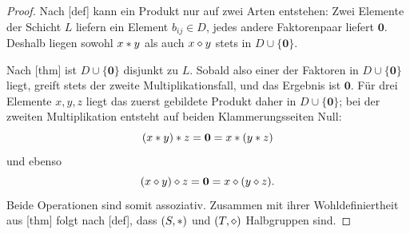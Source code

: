 \documentclass[main.tex]{subfiles}
\begin{document}
\begin{proof}
Nach [def] kann ein Produkt nur auf
zwei Arten entstehen: Zwei Elemente der Schicht \(L\) liefern ein Element
\(b_{ij}\in D\), jedes andere Faktorenpaar liefert \(\mathbf0\). Deshalb
liegen sowohl \(x\mathbin{\ast} y\) als auch \(x\mathbin{\diamond} y\) stets in
\(D\cup\{\mathbf0\}\).

Nach [thm] ist
\(D\cup\{\mathbf0\}\) disjunkt zu \(L\). Sobald also einer der Faktoren
in \(D\cup\{\mathbf0\}\) liegt, greift stets der zweite
Multiplikationsfall, und das Ergebnis ist \(\mathbf0\). Für drei Elemente
\(x,y,z\) liegt das zuerst gebildete Produkt daher in
\(D\cup\{\mathbf0\}\); bei der zweiten Multiplikation entsteht auf beiden
Klammerungsseiten Null:
\[
  (x\mathbin{\ast} y)\mathbin{\ast} z=\mathbf0
    =x\mathbin{\ast}(y\mathbin{\ast} z)
\]
und ebenso
\[
  (x\mathbin{\diamond} y)\mathbin{\diamond} z=\mathbf0
    =x\mathbin{\diamond}(y\mathbin{\diamond} z).
\]
Beide Operationen sind somit assoziativ. Zusammen mit ihrer
Wohldefiniertheit aus
[thm] folgt nach
[def], dass \((S,\mathbin{\ast})\) und
\((T,\mathbin{\diamond})\) Halbgruppen sind.
\end{proof}
\end{document}
